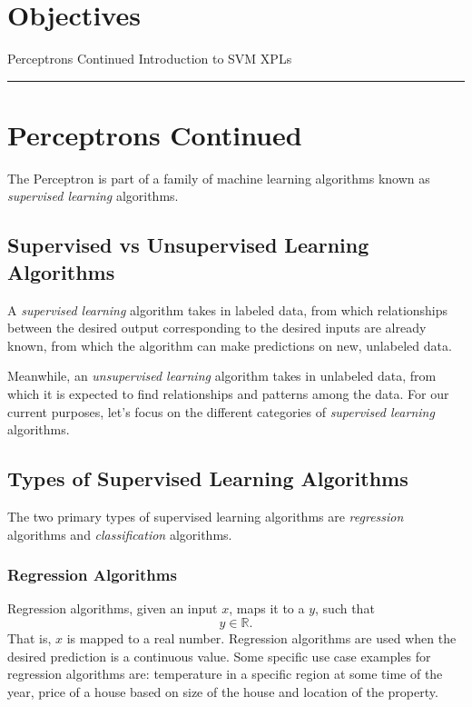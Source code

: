 \section*{Objectives}
\begin{outline}
    \1 Perceptrons Continued
    \1 Introduction to SVM
    \1 XPLs
\end{outline}

\rule[0.0051in]{\textwidth}{0.00025in}

\section{Perceptrons Continued}
The Perceptron\cite{rosenblatt1958perceptron} is part of a family of machine learning algorithms known as \textit{supervised learning} algorithms.

\subsection{Supervised vs Unsupervised Learning Algorithms}
A \textit{supervised learning} algorithm takes in labeled data, from which relationships between the desired output corresponding to the desired inputs are already known, from which the algorithm can make predictions on new, unlabeled data.

Meanwhile, an \textit{unsupervised learning} algorithm takes in unlabeled data, from which it is expected to find relationships and patterns among the data. For our current purposes, let's focus on the different categories of \textit{supervised learning} algorithms.

\subsection{Types of Supervised Learning Algorithms}
The two primary types of supervised learning algorithms are \textit{regression} algorithms and \textit {classification} algorithms.

\subsubsection{Regression Algorithms}
Regression algorithms, given an input $x$, maps it to a $y$, such that
\[
    y \in \mathbb{R}.
\]
That is, $x$ is mapped to a real number.
\vspace{2mm}
\newline
Regression algorithms are used when the desired prediction is a continuous value. Some specific use case examples for regression algorithms are: temperature in a specific region at some time of the year, price of a house based on size of the house and location of the property.

